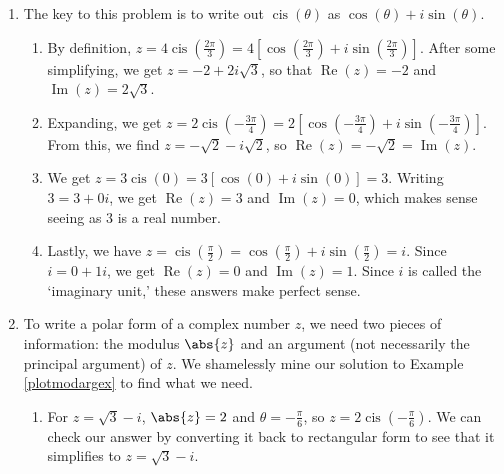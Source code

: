 {
\begin{enumerate}


\item The key to this problem is to write out $\operatorname{cis}(\theta)$ as $\cos(\theta) + i\sin(\theta)$.

\begin{enumerate}

\item By definition, $z =4 \operatorname{cis}\left(\frac{2\pi}{3}\right) = 4\left[\cos\left(\frac{2\pi}{3}\right) + i \sin\left(\frac{2\pi}{3}\right)\right]$. After some simplifying, we get $z = -2 + 2i\sqrt{3}$, so that $\operatorname{Re}(z) = -2$ and $\operatorname{Im}(z) = 2\sqrt{3}$.

\item Expanding, we get $z = 2 \operatorname{cis}\left(-\frac{3\pi}{4}\right) = 2\left[\cos\left(-\frac{3\pi}{4}\right) + i \sin\left(-\frac{3\pi}{4}\right)\right]$. From this, we find $z= -\sqrt{2} - i\sqrt{2}$, so $\operatorname{Re}(z) = -\sqrt{2} = \operatorname{Im}(z)$.

\item  We get  $z = 3 \operatorname{cis}(0) = 3\left[\cos(0) + i\sin(0)\right] = 3$.  Writing $3 = 3 + 0i$, we get $\operatorname{Re}(z) = 3$ and $\operatorname{Im}(z) = 0$, which makes sense seeing as $3$ is a real number.

\item  Lastly, we have  $z = \operatorname{cis}\left(\frac{\pi}{2}\right) = \cos\left(\frac{\pi}{2}\right)+ i\sin\left(\frac{\pi}{2}\right) = i$.  Since $i = 0 + 1i$, we get $\operatorname{Re}(z) = 0$ and $\operatorname{Im}(z) = 1$.  Since $i$ is called the `imaginary unit,'  these answers make perfect sense.

\end{enumerate}

\item  To write a polar form of a complex number $z$, we need two pieces of information:  the modulus $\abs{z}$ and an argument (not necessarily the principal argument) of $z$.   We shamelessly mine our solution to  Example \ref{plotmodargex} to find what we need.

\begin{enumerate}

\item  For $z = \sqrt{3}-i$, $\abs{z} = 2$ and $\theta = -\frac{\pi}{6}$, so $z = 2 \operatorname{cis}\left(-\frac{\pi}{6}\right)$.  We can check our answer by converting it back to rectangular form to see that it simplifies to $z = \sqrt{3} - i$.


\end{enumerate}
\end{enumerate}}

